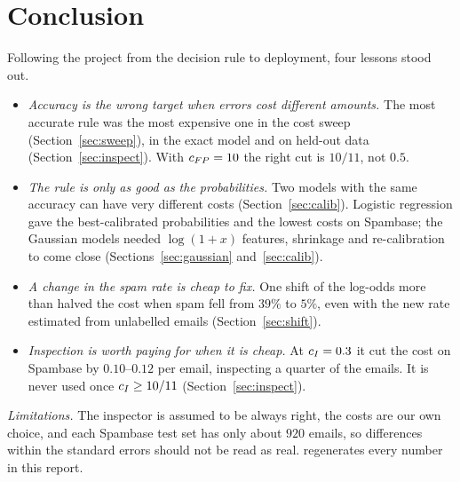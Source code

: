 \section{Conclusion}
\label{sec:conclusion}
Following the project from the decision rule to deployment, four lessons stood out.
\begin{itemize}
  \item \emph{Accuracy is the wrong target when errors cost different amounts.} The most accurate rule
        was the most expensive one in the cost sweep (Section~\ref{sec:sweep}), in the exact model and on
        held-out data (Section~\ref{sec:inspect}). With $c_{FP}=10$ the right cut is $10/11$, not $0.5$.
  \item \emph{The rule is only as good as the probabilities.} Two models with the same accuracy can
        have very different costs (Section~\ref{sec:calib}). Logistic regression gave the best-calibrated
        probabilities and the lowest costs on Spambase; the Gaussian models needed $\log(1+x)$ features,
        shrinkage and re-calibration to come close (Sections~\ref{sec:gaussian} and~\ref{sec:calib}).
  \item \emph{A change in the spam rate is cheap to fix.} One shift of the log-odds more than halved
        the cost when spam fell from $39\%$ to $5\%$, even with the new rate estimated from unlabelled
        emails (Section~\ref{sec:shift}).
  \item \emph{Inspection is worth paying for when it is cheap.} At $c_I=0.3$ it cut the cost on
        Spambase by $0.10$--$0.12$ per email, inspecting a quarter of the emails. It is never used once
        $c_I\ge10/11$ (Section~\ref{sec:inspect}).
\end{itemize}
\emph{Limitations.} The inspector is assumed to be always right, the costs are our own choice, and
each Spambase test set has only about $920$ emails, so differences within the standard errors should
not be read as real.
 regenerates every number in this report.
